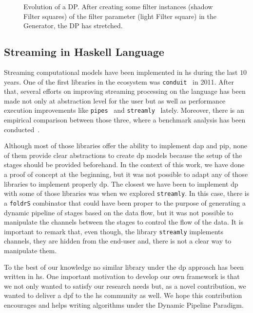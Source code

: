 \begin{figure}[h]
 \centering
 \caption[{[Pre] Evolution of DP}]{Evolution of a DP. After creating some filter instances (shadow Filter squares) of the filter parameter (light Filter square) in the Generator, the DP has stretched.}
\label{fig:activeDP}
\end{figure}


\subsection{Streaming in Haskell Language}
Streaming computational models have been implemented in \acrlong{hs} during the last $10$ years. One of the first libraries in the ecosystem was \texttt{conduit}~\cite{conduit} in 2011.
After that, several efforts on improving streaming processing on the language has been made not only at abstraction level for the user but as well as performance execution 
improvements like \texttt{pipes}~\cite{pipes} and \texttt{streamly}~\cite{streamly} lately.
Moreover, there is an empirical comparison between those three, where a benchmark analysis has been conducted~\cite{benchstreamhs}.

Although most of those libraries offer the ability to implement \acrshort{dap} and \acrshort{pip}, none of them provide clear abstractions to create \acrshort{dp} models because
the setup of the stages should be provided beforehand. In the context of this work, we have done a proof of concept at the beginning, 
but it was not possible to adapt any of those libraries to implement properly \acrshort{dp}. 
The closest we have been to implement \acrshort{dp} with some of those libraries was when we explored \texttt{streamly}.
In this case, there is a \texttt{foldrS} combinator that could have been proper to the purpose of generating a dynamic pipeline of stages based on the data flow, but it was not possible to manipulate the channels between the stages to control the flow of the data. It is important to remark that, even though, the  library  \texttt{streamly} implements channels, they are hidden from the end-user and, there is not a  clear way to manipulate them.

To the best of our knowledge no similar library under the  \acrshort{dp} approach has been written in \acrlong{hs}. 
One important motivation to develop our own framework is that  we not only  wanted to satisfy our research needs but, as a novel contribution, we wanted to deliver a \acrshort{dpf} to the \acrshort{hs} community as well. We hope this contribution encourages and helps writing algorithms under the Dynamic Pipeline Paradigm. 

